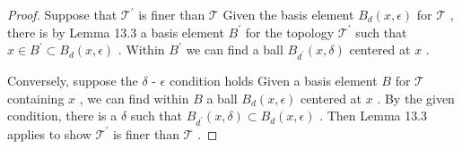 \begin{proof}
Suppose that \({\mathcal{T}}^{\prime }\) is finer than \(\mathcal{T}\) Given the basis element \({B}_{d}\left( {x,\epsilon }\right)\) for \(\mathcal{T}\) , there is by Lemma 13.3 a basis element \({B}^{\prime }\) for the topology \({\mathcal{T}}^{\prime }\) such that \(x \in  {B}^{\prime } \subset  {B}_{d}\left( {x,\epsilon }\right)\) . Within \({B}^{\prime }\) we can find a ball \({B}_{{d}^{\prime }}\left( {x,\delta }\right)\) centered at \(x\) .

Conversely, suppose the \(\delta\) - \(\epsilon\) condition holds Given a basis element \(B\) for \(\mathcal{T}\) containing \(x\) , we can find within \(B\) a ball \({B}_{d}\left( {x,\epsilon }\right)\) centered at \(x\) . By the given condition, there is a \(\delta\) such that \({B}_{{d}^{\prime }}\left( {x,\delta }\right)  \subset  {B}_{d}\left( {x,\epsilon }\right)\) . Then Lemma 13.3 applies to show \({\mathcal{T}}^{\prime }\) is finer than \(\mathcal{T}\) .
\end{proof}

